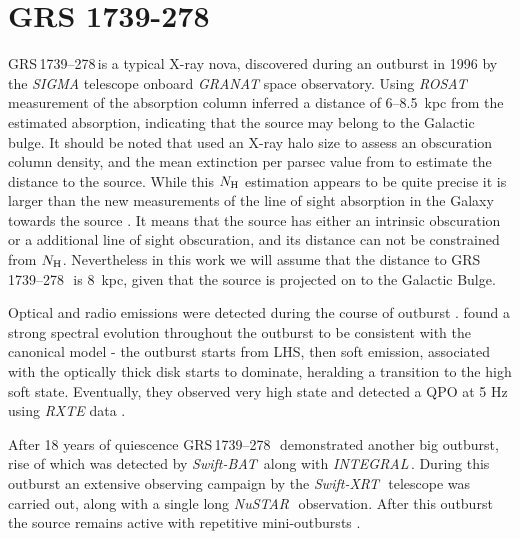 \documentclass[a4paper,fleqn,usenatbib]{mnras}
\def\grs{{GRS\,1739--278\,}}
\def\swiftx{{\em Swift-XRT\,}}
\def\swiftb{{\em Swift-BAT\,}}
\def\nustar{{\em NuSTAR\,}}
\def\integral{{\em INTEGRAL\,}}
\begin{document}
\section{GRS 1739-278}

\grs is a typical X-ray nova, discovered during an outburst in 1996 \citep{paul96} by the {\it SIGMA} \citep{paul91} telescope onboard {\it GRANAT} space observatory.
Using {\it ROSAT} measurement of the absorption column \citet{greiner96} inferred a distance of 6--8.5~kpc from the estimated absorption, indicating that the source may belong to the Galactic bulge. 
It should be noted that \citet{greiner96} used an X-ray halo size to assess an obscuration column density, and the mean extinction per parsec value from \citet{1973asqu.book.....A} to estimate the distance to the source. 
While this $N_{\rm H}$ estimation appears to be quite precise it is larger than the new measurements of the line of sight absorption in the Galaxy towards the source \citep{1990ARA&A..28..215D, 2005A&A...440..775K, 2006A&A...453..635M, 2014A&A...566A.120S}. 
It means that the source has either an intrinsic obscuration or a additional line of sight obscuration,  and its distance can not be constrained from $N_{\rm H}$.
Nevertheless in this work we will assume that the distance to \grs\ is 8~kpc, given that the source is projected on to the Galactic Bulge.  

Optical and radio emissions were detected during the course of outburst \citep{hjellming96,marti97}. 
\citet{borozdin98} found a strong spectral evolution throughout the outburst to be consistent with the canonical model - the outburst starts from LHS, then soft emission, associated with the optically thick disk starts to dominate, heralding a transition to the high soft state. 
Eventually, they observed very high state and detected a QPO at 5 Hz using {\it RXTE} data \citep{borozdin00, 2001MNRAS.328..451W}.

After 18 years of quiescence \grs\ demonstrated another big outburst, rise of which was detected by \swiftb \citep{krimm14_atel} along with \integral \citep{filippova14}. 
During this outburst an extensive observing campaign by the \swiftx\, telescope was carried out, along with a single long \nustar\ observation. 
After this outburst the source remains active with repetitive mini-outbursts \citep{mereminskiy17grs,yan17}.
\end{document}
